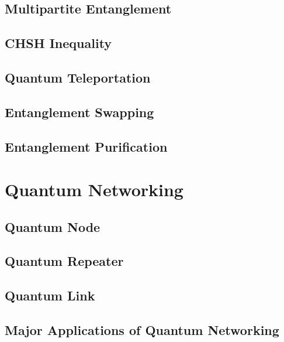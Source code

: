 \subsection{Multipartite Entanglement}
\subsection{CHSH Inequality}
\subsection{Quantum Teleportation}
\subsection{Entanglement Swapping}
\subsection{Entanglement Purification}

\section{Quantum Networking}
\subsection{Quantum Node}
\subsection{Quantum Repeater}
\subsection{Quantum Link}
\subsection{Major Applications of Quantum Networking}

